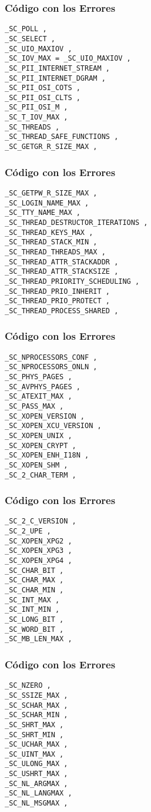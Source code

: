 \documentclass{beamer}
\begin{document}
\begin{frame}[fragile]
\frametitle{C\'odigo con los Errores}
\begin{verbatim}
_SC_POLL , 
_SC_SELECT , 
_SC_UIO_MAXIOV , 
_SC_IOV_MAX = _SC_UIO_MAXIOV , 
_SC_PII_INTERNET_STREAM , 
_SC_PII_INTERNET_DGRAM , 
_SC_PII_OSI_COTS , 
_SC_PII_OSI_CLTS , 
_SC_PII_OSI_M , 
_SC_T_IOV_MAX , 
_SC_THREADS , 
_SC_THREAD_SAFE_FUNCTIONS , 
_SC_GETGR_R_SIZE_MAX , 
\end{verbatim}
\end{frame}
\begin{frame}[fragile]
\frametitle{C\'odigo con los Errores}
\begin{verbatim}
_SC_GETPW_R_SIZE_MAX , 
_SC_LOGIN_NAME_MAX , 
_SC_TTY_NAME_MAX , 
_SC_THREAD_DESTRUCTOR_ITERATIONS , 
_SC_THREAD_KEYS_MAX , 
_SC_THREAD_STACK_MIN , 
_SC_THREAD_THREADS_MAX , 
_SC_THREAD_ATTR_STACKADDR , 
_SC_THREAD_ATTR_STACKSIZE , 
_SC_THREAD_PRIORITY_SCHEDULING , 
_SC_THREAD_PRIO_INHERIT , 
_SC_THREAD_PRIO_PROTECT , 
_SC_THREAD_PROCESS_SHARED , 
\end{verbatim}
\end{frame}
\begin{frame}[fragile]
\frametitle{C\'odigo con los Errores}
\begin{verbatim}
_SC_NPROCESSORS_CONF , 
_SC_NPROCESSORS_ONLN , 
_SC_PHYS_PAGES , 
_SC_AVPHYS_PAGES , 
_SC_ATEXIT_MAX , 
_SC_PASS_MAX , 
_SC_XOPEN_VERSION , 
_SC_XOPEN_XCU_VERSION , 
_SC_XOPEN_UNIX , 
_SC_XOPEN_CRYPT , 
_SC_XOPEN_ENH_I18N , 
_SC_XOPEN_SHM , 
_SC_2_CHAR_TERM , 
\end{verbatim}
\end{frame}
\begin{frame}[fragile]
\frametitle{C\'odigo con los Errores}
\begin{verbatim}
_SC_2_C_VERSION , 
_SC_2_UPE , 
_SC_XOPEN_XPG2 , 
_SC_XOPEN_XPG3 , 
_SC_XOPEN_XPG4 , 
_SC_CHAR_BIT , 
_SC_CHAR_MAX , 
_SC_CHAR_MIN , 
_SC_INT_MAX , 
_SC_INT_MIN , 
_SC_LONG_BIT , 
_SC_WORD_BIT , 
_SC_MB_LEN_MAX , 
\end{verbatim}
\end{frame}
\begin{frame}[fragile]
\frametitle{C\'odigo con los Errores}
\begin{verbatim}
_SC_NZERO , 
_SC_SSIZE_MAX , 
_SC_SCHAR_MAX , 
_SC_SCHAR_MIN , 
_SC_SHRT_MAX , 
_SC_SHRT_MIN , 
_SC_UCHAR_MAX , 
_SC_UINT_MAX , 
_SC_ULONG_MAX , 
_SC_USHRT_MAX , 
_SC_NL_ARGMAX , 
_SC_NL_LANGMAX , 
_SC_NL_MSGMAX , 
\end{verbatim}
\end{frame}
\end{document}
